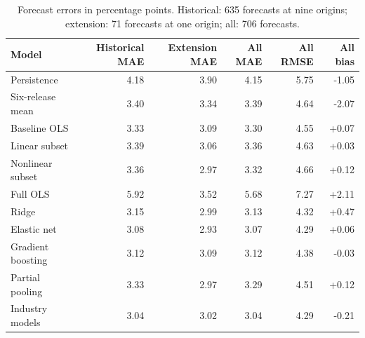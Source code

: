 \begin{table}[!htbp]
\centering
\small
\caption{Forecast errors in percentage points. Historical: 635 forecasts at nine origins; extension: 71 forecasts at one origin; all: 706 forecasts.}\label{tab:performance}
\begin{tabular}{lrrrrr}
\toprule
Model & Historical MAE & Extension MAE & All MAE & All RMSE & All bias \\
\midrule
Persistence & 4.18 & 3.90 & 4.15 & 5.75 & -1.05 \\
Six-release mean & 3.40 & 3.34 & 3.39 & 4.64 & -2.07 \\
Baseline OLS & 3.33 & 3.09 & 3.30 & 4.55 & +0.07 \\
Linear subset & 3.39 & 3.06 & 3.36 & 4.63 & +0.03 \\
Nonlinear subset & 3.36 & 2.97 & 3.32 & 4.66 & +0.12 \\
Full OLS & 5.92 & 3.52 & 5.68 & 7.27 & +2.11 \\
Ridge & 3.15 & 2.99 & 3.13 & 4.32 & +0.47 \\
Elastic net & 3.08 & 2.93 & 3.07 & 4.29 & +0.06 \\
Gradient boosting & 3.12 & 3.09 & 3.12 & 4.38 & -0.03 \\
Partial pooling & 3.33 & 2.97 & 3.29 & 4.51 & +0.12 \\
Industry models & 3.04 & 3.02 & 3.04 & 4.29 & -0.21 \\
\bottomrule
\end{tabular}
\end{table}
